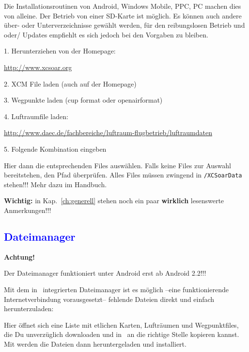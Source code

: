 Die Installationsroutinen von Android, Windows Mobile, PPC, PC machen dies von alleine. Der
Betrieb von einer SD-Karte ist möglich. Es können auch andere über- oder Unterverzeichnisse
gewählt werden, für den reibungslosen Betrieb und oder/ Updates empfiehlt es sich jedoch bei
den Vorgaben zu bleiben.\\


\begin{compactitem}
\item[1.] Herunterziehen von der Homepage:

 {\large\url{http://www.xcsoar.org}}
\item[2.] XCM File laden (auch auf der Homepage)
\item[3.] Wegpunkte laden (cup format oder openairformat)
\item[4.] Luftraumfile laden:

 {\large\url{http://www.daec.de/fachbereiche/luftraum-flugbetrieb/luftraumdaten}}
\item[5.] Folgende Kombination eingeben
\end{compactitem}

\bc\sk\blink{}\blink{}\ec{}

Hier dann die entsprechenden Files auswählen. Falls keine Files zur Auswahl bereitstehen, den
Pfad überprüfen. Alles Files müssen zwingend in {\large\texttt{/XCSoarData}} stehen!!! Mehr dazu im
Handbuch.

\textbf{Wichtig:} in Kap.~\ref{ch:generell} stehen noch ein paar \textbf{wirklich} lesenswerte Anmerkungen!!!

\subsection{\textcolor{blue}{Dateimanager}}
\textbf{Achtung!}

Der Dateimanager funktioniert unter Android erst ab Android 2.2!!!


Mit dem in \xc~integrierten Dateimanager ist es möglich --eine funktionierende Internetverbindung vorausgesetzt--
fehlende Dateien direkt und einfach herunterzuladen:

\bc{}\blink{}\ec
Hier öffnet sich eine Liste mit etlichen Karten, Lufträumen und Wegpunktfiles, die  Du unverzüglich
downloaden und in \xc~an die richtige Stelle kopieren kannst. 
Mit  werden die Dateien dann heruntergeladen und installiert. 

